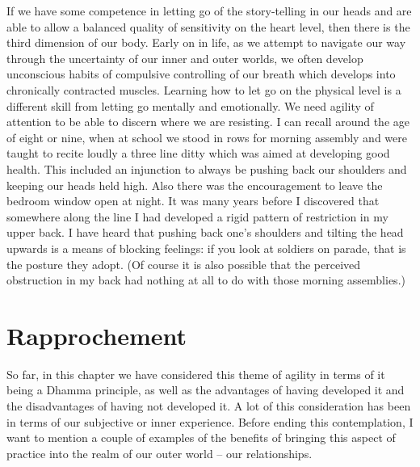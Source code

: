 If we have some competence in letting go of the story-telling in our
heads and are able to allow a balanced quality of sensitivity on the
heart level, then there is the third dimension of our body. Early on in
life, as we attempt to navigate our way through the uncertainty of our
inner and outer worlds, we often develop unconscious habits of
compulsive controlling of our breath which develops into chronically
contracted muscles. Learning how to let go on the physical level is a
different skill from letting go mentally and emotionally. We need
agility of attention to be able to discern where we are resisting. I can
recall around the age of eight or nine, when at school we stood in rows
for morning assembly and were taught to recite loudly a three line ditty which was
aimed at developing good health. This included an injunction
to always be pushing back our shoulders and keeping our heads
held high. Also there was the encouragement to leave the
bedroom window open at night. It was many years before I
discovered that somewhere along the line I had developed a rigid pattern of restriction in my upper back. I have heard that pushing back one's shoulders and tilting the head upwards is a
means of blocking feelings: if you look at soldiers on parade, that is the posture they adopt. (Of course it is also possible that the perceived obstruction in my back had nothing at all to do with those morning assemblies.)

\section{Rapprochement}

So far, in this chapter we have considered this theme of agility in
terms of it being a Dhamma principle, as well as the advantages of
having developed it and the disadvantages of having not developed it. A
lot of this consideration has been in terms of our subjective or inner
experience. Before ending this contemplation, I want to mention a couple
of examples of the benefits of bringing this aspect of practice into the
realm of our outer world -- our relationships.

